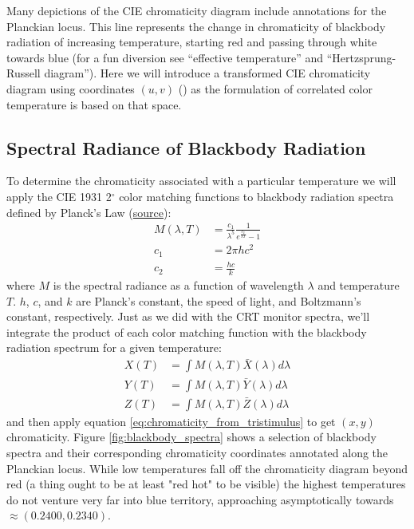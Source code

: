 \documentclass[twocolumn]{article}
\begin{document}
Many depictions of the CIE chromaticity diagram include annotations for the Planckian locus.  This line represents the change in chromaticity of blackbody radiation of increasing temperature, starting red and passing through white towards blue (for a fun diversion see “effective temperature” and “Hertzsprung-Russell diagram”).  Here we will introduce a transformed CIE chromaticity diagram using coordinates $(u,v)$ (\cite{cie_1960}) as the formulation of correlated color temperature is based on that space.
\subsection{Spectral Radiance of Blackbody Radiation}
To determine the chromaticity associated with a particular temperature we will apply the CIE 1931 2$^\circ$ color matching functions to blackbody radiation spectra defined by Planck’s Law (\href{https://en.wikipedia.org/wiki/Planckian_locus}{source}):
\begin{equation}
    \begin{aligned}
        M(\lambda,T)&=\frac{c_1}{\lambda^5}\frac{1}{e^{\frac{c_2}{\lambda T}}-1}\\
        c_1&=2\pi hc^2\\
        c_2&=\frac{hc}{k}
    \end{aligned}
\end{equation}
where $M$ is the spectral radiance as a function of wavelength $\lambda$ and temperature $T$.  $h$, $c$, and $k$ are Planck's constant, the speed of light, and Boltzmann's constant, respectively.  Just as we did with the CRT monitor spectra, we'll integrate the product of each color matching function with the blackbody radiation spectrum for a given temperature:
\begin{equation}
    \begin{aligned}
        X(T)&=\int M(\lambda,T)\bar{X}(\lambda)d\lambda\\
        Y(T)&=\int M(\lambda,T)\bar{Y}(\lambda)d\lambda\\
        Z(T)&=\int M(\lambda,T)\bar{Z}(\lambda)d\lambda
    \end{aligned}
\end{equation}
and then apply equation \ref{eq:chromaticity_from_tristimulus} to get $(x,y)$ chromaticity.  Figure \ref{fig:blackbody_spectra} shows a selection of blackbody spectra and their corresponding chromaticity coordinates annotated along the Planckian locus.  While low temperatures fall off the chromaticity diagram beyond red (a thing ought to be at least "red hot" to be visible) the highest temperatures do not venture very far into blue territory, approaching asymptotically towards $\approx(0.2400, 0.2340)$.
\end{document}
